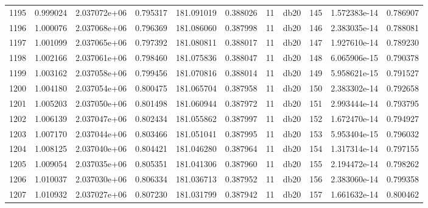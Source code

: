 \begin{tabular}{lrrrrrrlrrr}
1195 &    0.999024 &        2.037072e+06 &  0.795317 &              181.091019 &    0.388026 &      11 &         db20 &    145 &   1.572383e-14 &      0.786907 \\
1196 &    1.000076 &        2.037068e+06 &  0.796369 &              181.086060 &    0.387998 &      11 &         db20 &    146 &   2.383035e-14 &      0.788081 \\
1197 &    1.001099 &        2.037065e+06 &  0.797392 &              181.080811 &    0.388017 &      11 &         db20 &    147 &   1.927610e-14 &      0.789230 \\
1198 &    1.002166 &        2.037061e+06 &  0.798460 &              181.075836 &    0.388047 &      11 &         db20 &    148 &   6.065906e-15 &      0.790378 \\
1199 &    1.003162 &        2.037058e+06 &  0.799456 &              181.070816 &    0.388014 &      11 &         db20 &    149 &   5.958621e-15 &      0.791527 \\
1200 &    1.004180 &        2.037054e+06 &  0.800475 &              181.065704 &    0.387958 &      11 &         db20 &    150 &   2.383302e-14 &      0.792658 \\
1201 &    1.005203 &        2.037050e+06 &  0.801498 &              181.060944 &    0.387972 &      11 &         db20 &    151 &   2.993444e-14 &      0.793795 \\
1202 &    1.006139 &        2.037047e+06 &  0.802434 &              181.055862 &    0.387997 &      11 &         db20 &    152 &   1.672470e-14 &      0.794927 \\
1203 &    1.007170 &        2.037044e+06 &  0.803466 &              181.051041 &    0.387995 &      11 &         db20 &    153 &   5.953404e-15 &      0.796032 \\
1204 &    1.008125 &        2.037040e+06 &  0.804421 &              181.046280 &    0.387964 &      11 &         db20 &    154 &   1.317314e-14 &      0.797155 \\
1205 &    1.009054 &        2.037035e+06 &  0.805351 &              181.041306 &    0.387960 &      11 &         db20 &    155 &   2.194472e-14 &      0.798262 \\
1206 &    1.010037 &        2.037030e+06 &  0.806334 &              181.036713 &    0.387952 &      11 &         db20 &    156 &   2.383060e-14 &      0.799358 \\
1207 &    1.010932 &        2.037027e+06 &  0.807230 &              181.031799 &    0.387942 &      11 &         db20 &    157 &   1.661632e-14 &      0.800462 \\

\end{tabular}
